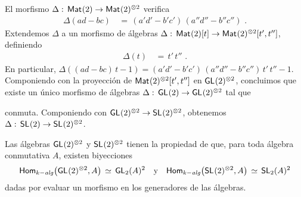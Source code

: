 \begin{obsProductoDeMatrices}\label{obs:productodematrices}
	El morfismo $\Delta:\,\mathsf{Mat}_{}(2)\rightarrow\mathsf{Mat}_{}(2)^{\otimes 2}$ verifica
	\begin{align*}
		\Delta(ad-bc) & \,=\,(a'd'-b'c')\,(a''d''-b''c'')
		\text{ .}
	\end{align*}
	Extendemos $\Delta$ a un morfismo de \'{a}lgebras
	$\Delta:\,\mathsf{Mat}_{}(2)[t]\rightarrow\mathsf{Mat}_{}(2)^{\otimes 2}[t',t'']$, definiendo
	\begin{align*}
		\Delta(t) & \,=\,t'\,t''
		\text{ .}
	\end{align*}
	En particular,
	\begin{math}
		\Delta((ad-bc)\,t-1)=(a'd'-b'c')\,(a''d''-b''c'')\,t'\,t''-1
	\end{math}. Componiendo con la proyecci\'{o}n de
	$\mathsf{Mat}_{}(2)^{\otimes 2}[t',t'']$ en $\mathsf{GL}_{}(2)^{\otimes 2}$, concluimos que
	existe un \'{u}nico morfismo de \'{a}lgebras
	$\Delta:\,\mathsf{GL}_{}(2)\rightarrow\mathsf{GL}_{}(2)^{\otimes 2}$ tal que
	\begin{center}
	\end{center}
	conmuta. Componiendo con
	$\mathsf{GL}_{}(2)^{\otimes 2}\rightarrow\mathsf{SL}_{}(2)^{\otimes 2}$, obtenemos
	$\Delta:\,\mathsf{SL}_{}(2)\rightarrow\mathsf{SL}_{}(2)^{\otimes 2}$.
\end{obsProductoDeMatrices}

Las \'{a}lgebras $\mathsf{GL}_{}(2)^{\otimes 2}$ y $\mathsf{SL}_{}(2)^{\otimes 2}$ tienen la
propiedad de que, para toda \'{a}lgebra conmutativa $A$, existen biyecciones
\begin{equation}
	\label{eq:morfismosdesdelinealgeneralproducto}
	\Homalg\big(\GL(2)^{\otimes 2},A\big)\,\simeq\,
		\GL[2](A)^2 \quad\text{y}\quad
	\Homalg\big(\SL(2)^{\otimes 2},A\big)\,\simeq\,
		\SL[2](A)^2
\end{equation}
%
dadas por evaluar un morfismo en los generadores de las \'{a}lgebras.

